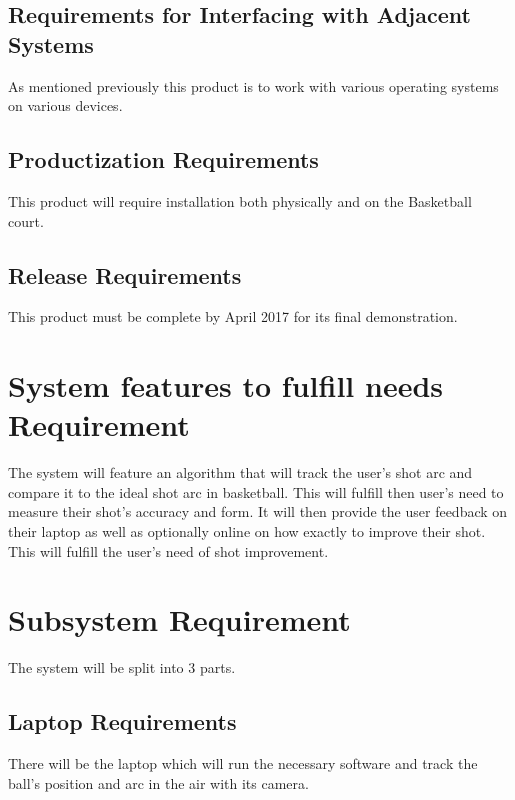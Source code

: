 \subsection{Requirements for Interfacing with Adjacent Systems}
\hspace*{4mm}As mentioned previously this product is to work with various operating systems on various devices.
 
\subsection{Productization Requirements}
\hspace*{4mm}This product will require installation both physically and on the Basketball court.
 
\subsection{Release Requirements}
\hspace*{4mm}This product must be complete by April 2017 for its final demonstration.

\section{System features to fulfill needs Requirement}
\hspace*{4mm} The system will feature an algorithm that will track the user's shot arc and compare it to the ideal shot arc in basketball. This will fulfill then user's need to measure their shot's accuracy and form. It will then provide the user feedback on their laptop as well as optionally online on how exactly to improve their shot. This will fulfill the user's need of shot improvement. 
 
\section{Subsystem Requirement}
\hspace*{4mm} The system will be split into 3 parts. 

\subsection{Laptop Requirements}
\hspace*{4mm}There will be the laptop which will run the necessary software and track the ball's position and arc in the air with its camera. 

